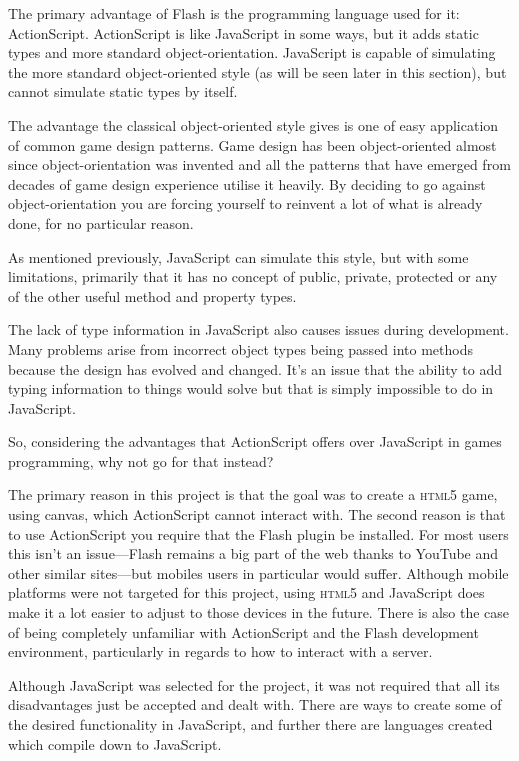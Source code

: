The primary advantage of Flash is the programming language used for it: ActionScript. ActionScript is like JavaScript in some ways, but it adds static types and more standard object-orientation. JavaScript is capable of simulating the more standard object-oriented style (as will be seen later in this section), but cannot simulate static types by itself.

The advantage the classical object-oriented style gives is one of easy application of common game design patterns. Game design has been object-oriented almost since object-orientation was invented and all the patterns that have emerged from decades of game design experience utilise it heavily. By deciding to go against object-orientation you are forcing yourself to reinvent a lot of what is already done, for no particular reason.

As mentioned previously, JavaScript can simulate this style, but with some limitations, primarily that it has no concept of public, private, protected or any of the other useful method and property types.

The lack of type information in JavaScript also causes issues during development. Many problems arise from incorrect object types being passed into methods because the design has evolved and changed. It's an issue that the ability to add typing information to things would solve but that is simply impossible to do in JavaScript.

So, considering the advantages that ActionScript offers over JavaScript in games programming, why not go for that instead?

The primary reason in this project is that the goal was to create a \textsc{html5} game, using canvas, which ActionScript cannot interact with. The second reason is that to use ActionScript you require that the Flash plugin be installed. For most users this isn't an issue---Flash remains a big part of the web thanks to YouTube and other similar sites---but mobiles users in particular would suffer. Although mobile platforms were not targeted for this project, using \textsc{html5} and JavaScript does make it a lot easier to adjust to those devices in the future. There is also the case of being completely unfamiliar with ActionScript and the Flash development environment, particularly in regards to how to interact with a server.

Although JavaScript was selected for the project, it was not required that all its disadvantages just be accepted and dealt with. There are ways to create some of the desired functionality in JavaScript, and further there are languages created which compile down to JavaScript.

